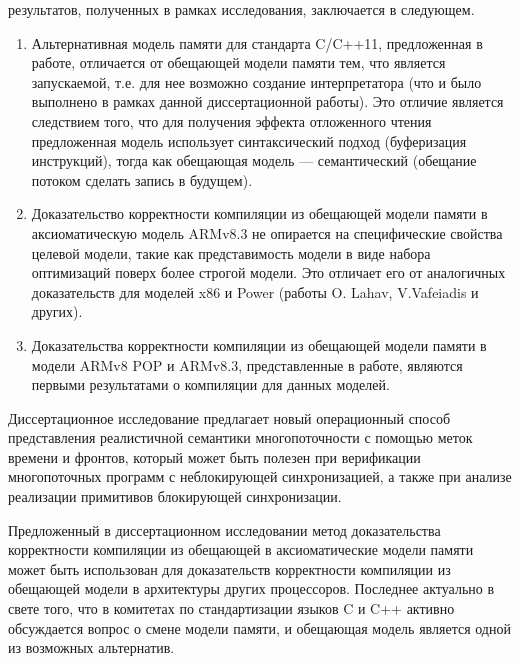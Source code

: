 {\novelty} результатов, полученных в рамках исследования, заключается в следующем.
\begin{enumerate}
  \item Альтернативная модель памяти для стандарта C/C++11, предложенная в работе, отличается от обещающей модели
  памяти тем, что является запускаемой,
  т.е. для нее возможно создание интерпретатора (что и было выполнено в рамках данной диссертационной работы).
  Это отличие является следствием того, что для получения эффекта отложенного чтения предложенная модель использует
  синтаксический подход (буферизация инструкций), тогда как обещающая модель --- семантический (обещание потоком сделать
  запись в будущем).
  \item Доказательство корректности компиляции из обещающей модели памяти в аксиоматическую модель
        ARMv8.3
        не опирается на специфические свойства целевой модели, такие как представимость модели в виде
        набора оптимизаций поверх более строгой модели.
        Это отличает его от аналогичных доказательств для моделей x86 и Power
        (работы O. Lahav, V.Vafeiadis и других).
  \item Доказательства корректности компиляции из обещающей модели памяти в
  модели ARMv8 POP и ARMv8.3, представленные
  в работе, являются первыми результатами о компиляции для данных моделей.
\end{enumerate}

{\influence}
Диссертационное исследование предлагает новый
операционный способ представления реалистичной семантики многопоточности с помощью меток времени и фронтов, который
может быть полезен при верификации многопоточных программ с неблокирующей синхронизацией, а также при анализе
реализации примитивов блокирующей синхронизации.

Предложенный в диссертационном исследовании метод доказательства корректности компиляции из обещающей в
аксиоматические модели памяти может быть использован для доказательств корректности компиляции
из обещающей модели в архитектуры других процессоров.
Последнее актуально в свете того, что
в комитетах по стандартизации языков C и C++ активно обсуждается вопрос о смене модели памяти, и обещающая модель 
является одной из возможных альтернатив. 


